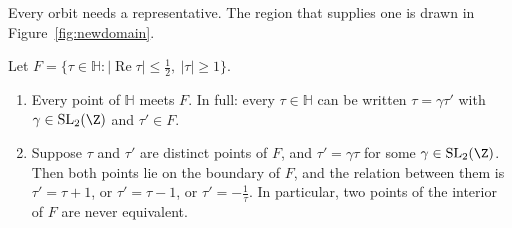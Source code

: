 Every orbit needs a representative. The region that supplies one is drawn in Figure~\ref{fig:newdomain}.

\begin{theorem}\label{thm:fundamental}
Let $F=\{\tau\in\mathbb H:|\operatorname{Re}\tau|\le\frac12,\ |\tau|\ge1\}$.
\begin{enumerate}[label=(\alph*)]
\item Every point of $\mathbb H$ meets $F$. In full: every $\tau\in\mathbb H$ can be written $\tau=\gamma\tau'$ with $\gamma\in\mathrm{SL}_2(\Z)$ and $\tau'\in F$.
\item Suppose $\tau$ and $\tau'$ are distinct points of $F$, and $\tau'=\gamma\tau$ for some $\gamma\in\mathrm{SL}_2(\Z)$. Then both points lie on the boundary of $F$, and the relation between them is $\tau'=\tau+1$, or $\tau'=\tau-1$, or $\tau'=-\frac1\tau$. In particular, two points of the interior of $F$ are never equivalent.
\end{enumerate}
\end{theorem}

